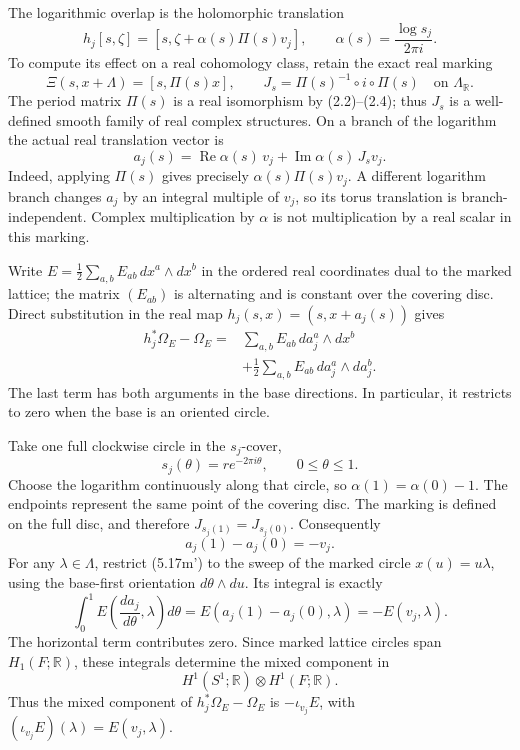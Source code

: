 
The logarithmic overlap is the holomorphic translation
\[
 h_j[s,\zeta]=[s,\zeta+\alpha(s)\Pi(s)v_j],
 \qquad \alpha(s)=\frac{\log s_j}{2\pi i}.
\]
To compute its effect on a real cohomology class, retain the exact
real marking
\[
 \Xi(s,x+\Lambda)=[s,\Pi(s)x],\qquad
 J_s=\Pi(s)^{-1}\circ i\circ\Pi(s)
 \quad\text{on }\Lambda_{\mathbb R}.
\]
The period matrix \(\Pi(s)\) is a real isomorphism by (2.2)--(2.4);
thus \(J_s\) is a well-defined smooth family of real complex
structures.  On a branch of the logarithm the actual real
translation vector is
\[
 a_j(s)=\operatorname{Re}\alpha(s)\,v_j+
        \operatorname{Im}\alpha(s)\,J_s v_j.
 \tag{5.17m}
\]
Indeed, applying \(\Pi(s)\) gives precisely
\(\alpha(s)\Pi(s)v_j\).  A different logarithm branch changes
\(a_j\) by an integral multiple of \(v_j\), so its torus translation
is branch-independent.  Complex multiplication by \(\alpha\) is
not multiplication by a real scalar in this marking.

Write \(E=\frac12\sum_{a,b}E_{ab}\,dx^a\wedge dx^b\) in the
ordered real coordinates dual to the marked lattice; the matrix
\((E_{ab})\) is alternating and is constant over the covering
disc.  Direct substitution in the real map
\(h_j(s,x)=(s,x+a_j(s))\) gives
\[
 \begin{split}
 h_j^*\Omega_E-\Omega_E
  ={}&\sum_{a,b}E_{ab}\,d a_j^a\wedge dx^b\\
    &+\frac12\sum_{a,b}E_{ab}\,d a_j^a\wedge d a_j^b.
 \end{split}
 \tag{5.17m'}
\]
The last term has both arguments in the base directions.
In particular, it restricts to zero when the base is an oriented
circle.

Take one full clockwise circle in the \(s_j\)-cover,
\[
 s_j(\theta)=r e^{-2\pi i\theta},\qquad 0\le\theta\le1.
\]
Choose the logarithm continuously along that circle, so
\(\alpha(1)=\alpha(0)-1\).  The endpoints represent the same
point of the covering disc.  The marking is defined on the full
disc, and therefore \(J_{s_j(1)}=J_{s_j(0)}\).  Consequently
\[
 a_j(1)-a_j(0)=-v_j.
 \tag{5.17m''}
\]
For any \(\lambda\in\Lambda\), restrict (5.17m') to the sweep of
the marked circle \(x(u)=u\lambda\), using the base-first
orientation \(d\theta\wedge du\).  Its integral is exactly
\[
 \int_0^1 E\!\left(\frac{d a_j}{d\theta},\lambda\right)d\theta
 =E(a_j(1)-a_j(0),\lambda)
 =-E(v_j,\lambda).
\]
The horizontal term contributes zero.  Since marked lattice
circles span \(H_1(F;\mathbb R)\), these integrals determine the
mixed component in
\[
 H^1(S^1;\mathbb R)\otimes H^1(F;\mathbb R).
\]
Thus the mixed component of \(h_j^*\Omega_E-\Omega_E\) is
\(-\iota_{v_j}E\), with \((\iota_{v_j}E)(\lambda)=E(v_j,\lambda)\).

